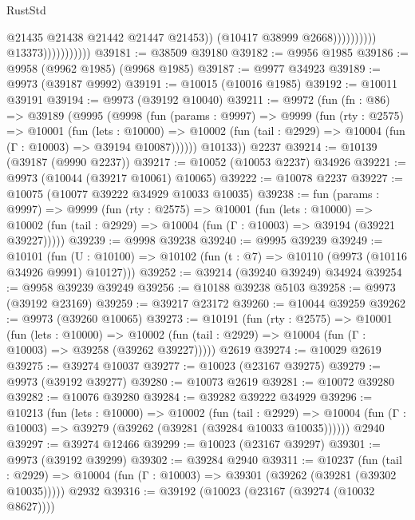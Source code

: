 \begin{lexlean}{RustStd}
\begin{coremodule}
                                                @21435
                                                @21438
                                                @21442
                                                @21447
                                                @21453))
                                            (@10417 @38999 @2668))))))))))
                          @13373)))))))))))
@39181 := @38509 @39180
@39182 := @9956 @1985
@39186 := @9958 (@9962 @1985) (@9968 @1985)
@39187 := @9977 @34923
@39189 := @9973 (@39187 @9992)
@39191 := @10015 (@10016 @1985)
@39192 := @10011 @39191
@39194 := @9973 (@39192 @10040)
@39211 := @9972
    (fun (fn : @86) =>
    @39189
      (@9995
        (@9998
          (fun (params : @9997) =>
          @9999
            (fun (rty : @2575) =>
            @10001
              (fun (lets : @10000) =>
              @10002 (fun (tail : @2929) => @10004 (fun (Γ : @10003) => @39194 @10087))))))
        @10133))
    @2237
@39214 := @10139 (@39187 (@9990 @2237))
@39217 := @10052 (@10053 @2237) @34926
@39221 := @9973 (@10044 (@39217 @10061) @10065)
@39222 := @10078 @2237
@39227 := @10075 (@10077 @39222 @34929 @10033 @10035)
@39238 := fun (params : @9997) =>
  @9999
    (fun (rty : @2575) =>
    @10001
      (fun (lets : @10000) =>
      @10002 (fun (tail : @2929) => @10004 (fun (Γ : @10003) => @39194 (@39221 @39227)))))
@39239 := @9998 @39238
@39240 := @9995 @39239
@39249 := @10101
    (fun (U : @10100) => @10102 (fun (t : @7) => @10110 (@9973 (@10116 @34926 @9991) @10127)))
@39252 := @39214 (@39240 @39249) @34924
@39254 := @9958 @39239 @39249
@39256 := @10188 @39238 @5103
@39258 := @9973 (@39192 @23169)
@39259 := @39217 @23172
@39260 := @10044 @39259
@39262 := @9973 (@39260 @10065)
@39273 := @10191
    (fun (rty : @2575) =>
    @10001
      (fun (lets : @10000) =>
      @10002 (fun (tail : @2929) => @10004 (fun (Γ : @10003) => @39258 (@39262 @39227)))))
    @2619
@39274 := @10029 @2619
@39275 := @39274 @10037
@39277 := @10023 (@23167 @39275)
@39279 := @9973 (@39192 @39277)
@39280 := @10073 @2619
@39281 := @10072 @39280
@39282 := @10076 @39280
@39284 := @39282 @39222 @34929
@39296 := @10213
    (fun (lets : @10000) =>
    @10002
      (fun (tail : @2929) =>
      @10004 (fun (Γ : @10003) => @39279 (@39262 (@39281 (@39284 @10033 @10035))))))
    @2940
@39297 := @39274 @12466
@39299 := @10023 (@23167 @39297)
@39301 := @9973 (@39192 @39299)
@39302 := @39284 @2940
@39311 := @10237
    (fun (tail : @2929) => @10004 (fun (Γ : @10003) => @39301 (@39262 (@39281 (@39302 @10035)))))
    @2932
@39316 := @39192 (@10023 (@23167 (@39274 (@10032 @8627))))

\end{coremodule}
\end{lexlean}
